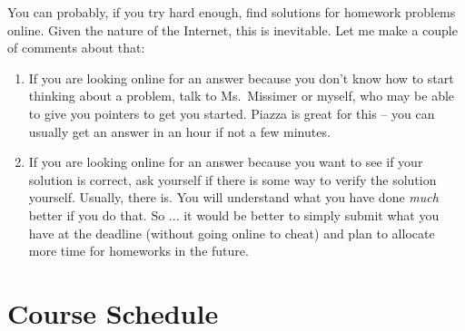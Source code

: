 \documentclass[11pt]{article}
\begin{document}
You can probably, if you try hard enough, find solutions for homework
problems online.    Given the nature of the Internet, this is
inevitable.   Let me make a couple of comments about that:
\begin{enumerate}
\item If you are looking online for an answer because you don't know how
  to start thinking about a problem, talk to Ms.\ Missimer or myself, who may be
  able to give you pointers to get you started.  Piazza is great for
  this -- you can usually get an answer in an hour if not a few minutes.
\item If you are looking online for an answer because you want to see if
  your solution is correct, ask yourself if there is some way to verify
  the solution yourself.   Usually, there is.  You will understand what you have done
  \emph{much} better if you do that.
So ... it would be better to simply submit what you have at the deadline
(without going online to cheat) and plan to allocate more time for
homeworks in the future.
\end{enumerate}

\newpage
\section*{Course Schedule}
\end{document}
